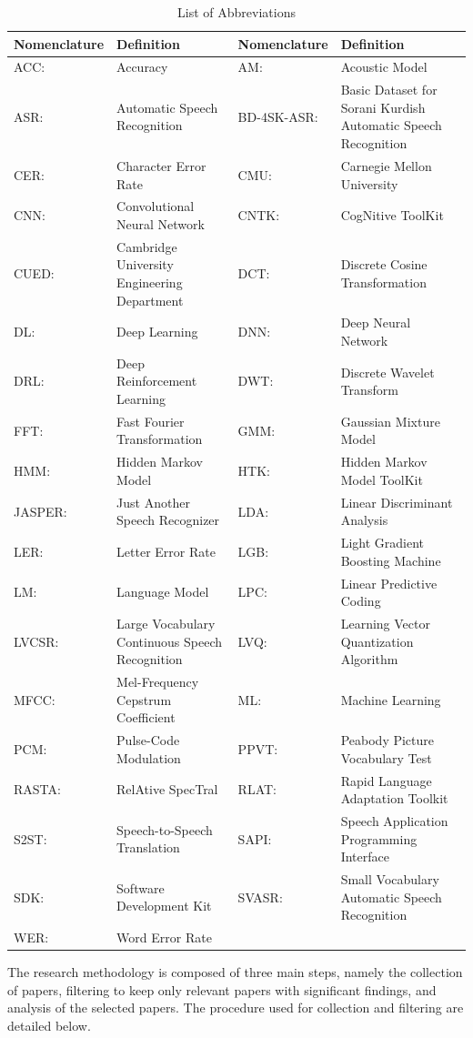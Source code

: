 \begin{table}
\caption{List of Abbreviations}\label{tab2}
\centering
\begin{tabular}{ p{1.5cm} p{5.5cm} |p{1.8cm} p{6.3cm}}
 \hline
 Nomenclature & Definition&  Nomenclature &Definition\\
 \hline
ACC: &Accuracy &AM: &Acoustic Model\\
ASR: &Automatic Speech Recognition& BD-4SK-ASR:& Basic Dataset for Sorani Kurdish Automatic Speech Recognition\\
CER:& Character Error Rate&
CMU:& Carnegie Mellon University\\
CNN:& Convolutional Neural Network&
CNTK:& CogNitive ToolKit\\
CUED:& Cambridge University Engineering Department&
DCT:& Discrete Cosine Transformation\\
DL:& Deep Learning&
DNN:& Deep Neural Network\\
DRL:& Deep Reinforcement Learning&
DWT:& Discrete Wavelet Transform\\
FFT:& Fast Fourier Transformation&
GMM:& Gaussian Mixture Model\\
HMM:& Hidden Markov Model&
HTK:& Hidden Markov Model ToolKit\\
JASPER:& Just Another Speech Recognizer&
LDA:& Linear Discriminant Analysis\\
LER:& Letter Error Rate&
LGB:& Light Gradient Boosting Machine\\
LM:& Language Model&
LPC:& Linear Predictive Coding\\
LVCSR:& Large Vocabulary Continuous Speech Recognition&
LVQ: &Learning Vector Quantization Algorithm\\
MFCC: & Mel-Frequency Cepstrum Coefficient&
ML:& Machine Learning\\
PCM:& Pulse-Code Modulation&
PPVT:& Peabody Picture Vocabulary Test\\
RASTA:& RelAtive SpecTral&
RLAT:& Rapid Language Adaptation Toolkit\\
S2ST: & Speech-to-Speech Translation&
SAPI:& Speech Application Programming Interface\\
SDK:& Software Development Kit&
SVASR: &Small Vocabulary Automatic Speech Recognition\\
WER:& Word Error Rate\\
\hline
\end{tabular}
\end{table}

The research methodology is composed of three main steps, namely the collection of papers, filtering to keep only relevant papers with significant findings, and analysis of the selected papers. The procedure used for collection and filtering are detailed below.

